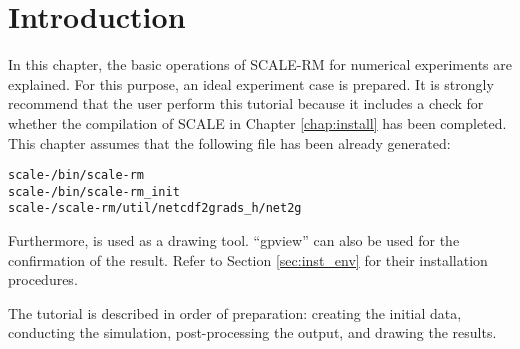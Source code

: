 \section{Introduction} \label{sec:ideal_exp_intro}

In this chapter, the basic operations of SCALE-RM for numerical experiments are explained. For this purpose, an ideal experiment case is prepared. It is strongly recommend that the user perform this tutorial because it includes a check for whether the compilation of SCALE  in Chapter \ref{chap:install} has been completed. This chapter assumes that the following file has been already generated:
\begin{alltt}
  scale-{\version}/bin/scale-rm
  scale-{\version}/bin/scale-rm_init
  scale-{\version}/scale-rm/util/netcdf2grads_h/net2g
\end{alltt}
Furthermore, \grads is used as a drawing tool. ``gpview'' can also be used for the confirmation of the result. Refer to Section \ref{sec:inst_env} for their installation procedures.

The tutorial is described in order of preparation: creating the initial data, conducting the simulation, post-processing the output, and drawing the results.



